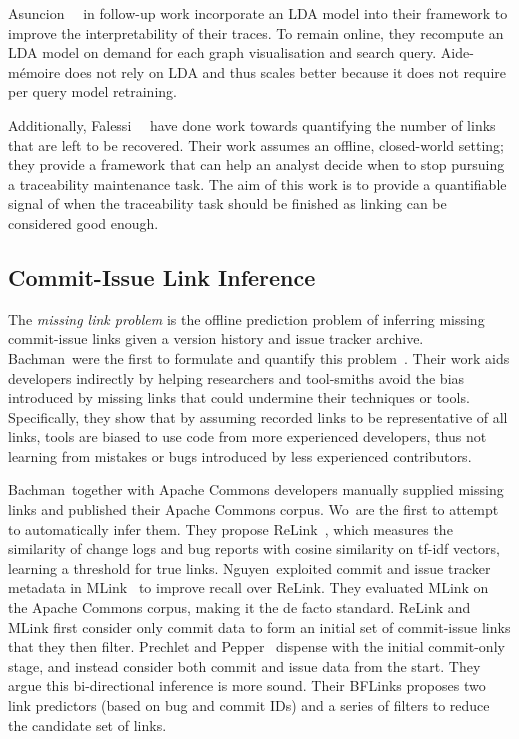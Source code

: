 Asuncion~\etal~\cite{TopicTraceability} in follow-up work incorporate an LDA
model into their framework to improve the interpretability of their traces. To
remain online, they recompute an LDA model on demand for each graph
visualisation and search query. Aide-mémoire does not rely on LDA and thus
scales better because it does not require per query model retraining.

Additionally, Falessi~\etal~\cite{Falessi2017} have done work towards
quantifying the number of links that are left to be recovered. Their work
assumes an offline, closed-world setting; they provide a framework that can help
an analyst decide when to stop pursuing a traceability maintenance task. The aim
of this work is to provide a quantifiable signal of when the traceability task
should be finished as linking can be considered good enough.

\subsection{Commit-Issue Link Inference}
\label{chapter:literature:sec:am_rel_work:cli}

The \emph{missing link problem} is the offline prediction problem of inferring
missing commit-issue links given a version history and issue tracker archive.
Bachman~\etal were the first to formulate and quantify this
problem~\cite{Bird2009,MissingLinks}. Their work aids developers indirectly by
helping researchers and tool-smiths avoid the bias introduced by missing links
that could undermine their techniques or tools. Specifically, they show that by
assuming recorded links to be representative of all links, tools are biased to
use code from more experienced developers, thus not learning from mistakes or
bugs introduced by less experienced contributors. 

Bachman~\etal together with Apache Commons developers manually supplied missing
links and published their Apache Commons corpus. Wo~\etal are the first to
attempt to automatically infer them. They propose ReLink~\cite{relink}, which
measures the similarity of change logs and bug reports with cosine similarity on
tf-idf vectors, learning a threshold for true links. Nguyen~\etal exploited
commit and issue tracker metadata in MLink~\cite{MLink} to improve recall over
ReLink. They evaluated MLink on the Apache Commons corpus, making it the de
facto standard. ReLink and MLink first consider only commit data to form an
initial set of commit-issue links that they then filter. Prechlet and
Pepper~\cite{prechelt2014bflinks} dispense with the initial commit-only stage,
and instead consider both commit and issue data from the start. They argue this
bi-directional inference is more sound. Their BFLinks proposes two link
predictors (based on bug and commit IDs) and a series of filters to reduce the
candidate set of links.

